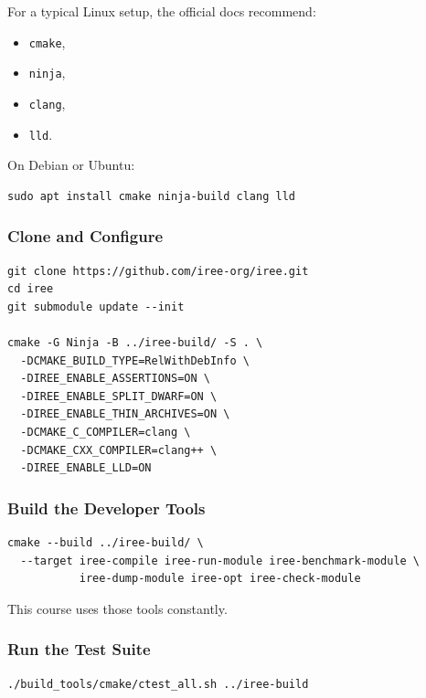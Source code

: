 \documentclass[11pt,a4paper]{article}
\begin{document}
For a typical Linux setup, the official docs recommend:
\begin{itemize}
    \item \texttt{cmake},
    \item \texttt{ninja},
    \item \texttt{clang},
    \item \texttt{lld}.
\end{itemize}

On Debian or Ubuntu:

\begin{lstlisting}[caption=Typical Linux prerequisites]
sudo apt install cmake ninja-build clang lld
\end{lstlisting}

\subsubsection{Clone and Configure}

\begin{lstlisting}[caption=Clone and configure IREE]
git clone https://github.com/iree-org/iree.git
cd iree
git submodule update --init

cmake -G Ninja -B ../iree-build/ -S . \
  -DCMAKE_BUILD_TYPE=RelWithDebInfo \
  -DIREE_ENABLE_ASSERTIONS=ON \
  -DIREE_ENABLE_SPLIT_DWARF=ON \
  -DIREE_ENABLE_THIN_ARCHIVES=ON \
  -DCMAKE_C_COMPILER=clang \
  -DCMAKE_CXX_COMPILER=clang++ \
  -DIREE_ENABLE_LLD=ON
\end{lstlisting}

\subsubsection{Build the Developer Tools}

\begin{lstlisting}[caption=Build a minimal useful tool set]
cmake --build ../iree-build/ \
  --target iree-compile iree-run-module iree-benchmark-module \
           iree-dump-module iree-opt iree-check-module
\end{lstlisting}

This course uses those tools constantly.

\subsubsection{Run the Test Suite}

\begin{lstlisting}[caption=Run the CMake test wrapper]
./build_tools/cmake/ctest_all.sh ../iree-build
\end{lstlisting}
\end{document}
